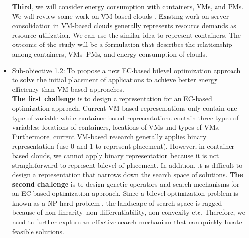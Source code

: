 \begin{itemize}
	\textbf{Third}, we will consider energy consumption with containers, 
	VMs, and PMs. We will review some work on VM-based clouds \cite{Ferdaus:2014ep, Xu:2010vh, Gao:2013gg}. 
	Existing work on server consolidation in VM-based clouds generally represents resource demands as resource utilization. 
	We can use the similar idea to represent containers. The outcome of the study will be a formulation that describes the relationship among containers, VMs, PMs, and energy consumption of clouds.

	





	\item Sub-objective 1.2: To propose a new EC-based bilevel optimization approach to solve the initial placement of applications to achieve better energy efficiency than VM-based approaches.\\

	 \textbf{The first challenge} is to design a representation for an EC-based optimization approach. Current VM-based representations only contain one type of variable while container-based representations contain three types of variables: locations of containers, locations of VMs and types of VMs. Furthermore, current VM-based research generally applies binary representation (use 0 and 1 to represent placement). However, in container-based clouds, we cannot apply binary representation because it is not straightforward to represent bilevel of placement. 
	In addition, it is difficult to design a representation that narrows down the search space of solutions.  \textbf{The second challenge} is to design genetic operators and search mechanisms for an EC-based optimization approach. Since a bilevel optimization problem is known as a NP-hard problem \cite{Mathieu:2011dw}, the landscape of search space is ragged because of non-linearity, non-differentiability, non-convexity etc. Therefore, we need to further explore an effective search mechanism that can quickly locate feasible solutions.


\end{itemize}

